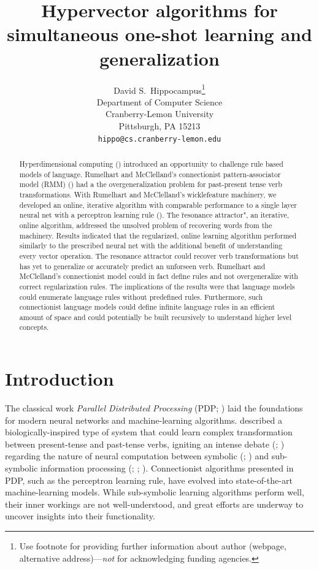 \documentclass{article}
\title{Hypervector algorithms for simultaneous one-shot learning and generalization}
\author{
  David S.~Hippocampus\thanks{Use footnote for providing further
    information about author (webpage, alternative
    address)---\emph{not} for acknowledging funding agencies.} \\
  Department of Computer Science\\
  Cranberry-Lemon University\\
  Pittsburgh, PA 15213 \\
  \texttt{hippo@cs.cranberry-lemon.edu} \\
}
\begin{document}

\maketitle

\begin{abstract}
Hyperdimensional computing (\citet{Kanerva2009}) introduced an opportunity to challenge rule based models of language. 
Rumelhart and McClelland's connectionist pattern-associator model (RMM) (\citet{Pinker2002a}) had a the overgeneralization problem for past-present tense verb transformations.
With Rumelhart and McClelland's wicklefeature machinery, we developed an online, iterative algorithm with comparable performance to a single layer neural net with a perceptron learning rule (\citet{Rumelhart1986a}). The \"resonance attractor", an iterative, online algorithm, addressed the unsolved problem of recovering words from the machinery.
Results indicated that the regularized, online learning algorithm performed similarly to the prescribed neural net with the additional benefit of understanding every vector operation. The resonance attractor could recover verb transformations but has yet to generalize or accurately predict an unforseen verb. 
Rumelhart and McClelland's connectionist model could in fact define rules and not overgeneralize with correct regularization rules. The implications of the results were that language models could enumerate language rules without predefined rules. Furthermore, such connectionist language models could define infinite language rules in an efficient amount of space and could potentially be built recursively to understand higher level concepts.

\end{abstract}

\section{Introduction}

The classical work \emph{Parallel Distributed Processing} (PDP; \citet{McClelland1986}) laid the foundations for modern neural networks and machine-learning algorithms. 
\citet{Rumelhart1986a} described a biologically-inspired type of system that could learn complex transformation between present-tense and past-tense verbs, igniting an intense debate (\citet{Pinker1988}; \citet{Fodor1988}) regarding the nature of neural computation between symbolic (\citet{Pinker2002a}; \citet{Fodor1990}) and sub-symbolic information processing (\citet{MacWhinney1991}; \citet{Bullinaria1994}; \citet{McClelland2002}). Connectionist algorithms presented in PDP, such as the perceptron learning rule, have evolved into state-of-the-art machine-learning models. While sub-symbolic learning algorithms perform well, their inner workings are not well-understood, and great efforts are underway to uncover insights into their functionality.
\end{document}
